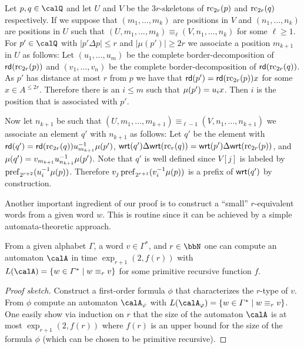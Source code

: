 \begin{definition}
	Let $p,q\in \Qx$ and let $U$ and $V$ be the $3r$-skeletons of $\operatorname{rc}_{2r}(p)$ and $\operatorname{rc}_{2r}(q)$ respectively. If we suppose that $(m_1,\ldots,m_k)$ are positions in $V$ and $(n_1,\ldots,n_k)$ are positions in $U$ such that $(U,m_1,\ldots,m_k) \equiv_{\ell} (V,n_1,\ldots,n_k)$ for some $\ell \geq 1$. For $p'\in \Qx$ with $|p'\Delta p| \leq r$ and $|\mu(p')| \geq 2r$ we associate a position $m_{k+1}$ in $U$ as follows:
	Let $(u_1,\ldots, u_m)$ be the complete border-decomposition of $\mathsf{rd}(\operatorname{rc}_{2r}(p))$ and $(v_1,\ldots,v_n)$ be the complete border-decomposition of $\mathsf{rd}(\operatorname{rc}_{2r}(q))$. As $p'$ has distance at most $r$ from $p$ we have that $\mathsf{rd}(p') = \mathsf{rd}(\operatorname{rc}_{2r}(p))x$
	for some $x\in A^{\leq 2r}$. Therefore there is an $i\leq m$ such that $\mu(p') = u_ix$. Then $i$ is the position that is associated with $p'$.
	
	Now let $n_{k+1}$ be such that $(U,m_1,\ldots,m_{k+1}) \equiv_{\ell-1} (V,n_1,\ldots,n_{k+1})$ we associate an element $q'$ with $n_{k+1}$ as follows:
	Let $q'$ be the element with $\mathsf{rd}(q') = \mathsf{rd}(\operatorname{rc}_{2r}(q))u_{m_{k+1}}^{-1}\mu(p')$, $\mathsf{wrt}(q')\Delta\mathsf{wrt}(\operatorname{rc}_r({q})) = \mathsf{wrt}(p')\Delta\mathsf{wrt}(\operatorname{rc}_{2r}({p}))$, and 
	$\mu(q') = v_{m_{k+1}}u_{n_{k+1}}^{-1}\mu(p')$. Note that $q'$ is well defined since $V[j]$ is labeled by $\operatorname{pref}_{2^{r+2}}(u_i^{-1}\mu(p))$. Therefore $v_j\operatorname{pref}_{2^{r+1}}(v_i^{-1}\mu(p))$ is a prefix of $\mathsf{wrt}(q')$ by construction.
\end{definition}

Another important ingredient of our proof is to construct a ``small'' $r$-equivalent words from a given word $w$. This is routine since it can be achieved by a simple automata-theoretic approach.
\begin{lemma}\label{lem:r-equiv_word_construction}
	From a given alphabet $\Gamma$, a word $v\in\Gamma^\ast$, and $r\in\bbN$ one can compute an automaton $\calA$ in time $\exp_{r+1}(2, f(r))$ with $L(\calA) = \{w\in \Gamma^\ast\mid w\equiv_r v \}$ for some primitive recursive function $f$.
\end{lemma}
\begin{proof}[Proof sketch]
	Construct a first-order formula $\phi$ that characterizes the $r$-type of $v$. From $\phi$ compute an automaton $\calA_\phi$ with $L(\calA_\phi) = \{ w\in\Gamma^\ast \mid w\equiv_r v \}$. One easily show via induction on $r$ that the size of the automaton $\calA$ is at most
	$\exp_{r+1}(2, f(r))$ where $f(r)$ is an upper bound for the size of the formula $\phi$ (which can be chosen to be primitive recursive).
\end{proof}

